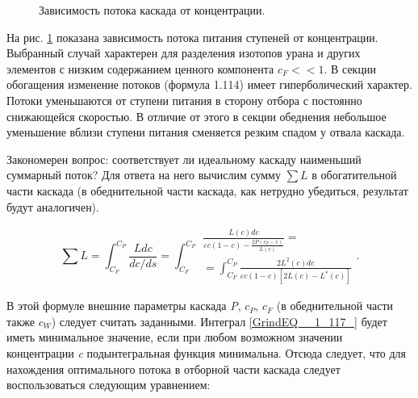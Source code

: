 \begin{figure}[ht]
    \caption{Зависимость потока каскада от концентрации.}\label{depend}
  \end{figure}

На рис. \ref*{depend} показана зависимость потока питания ступеней от концентрации. Выбранный случай характерен для разделения изотопов урана и других элементов с низким содержанием ценного компонента $c_{F} <<1$. В секции обогащения изменение потоков (формула 1.114) имеет гиперболический характер. Потоки уменьшаются от ступени питания в сторону отбора с постоянно снижающейся скоростью. В отличие от этого в секции обеднения небольшое уменьшение вблизи ступени питания сменяется резким спадом у отвала каскада.

Закономерен вопрос: соответствует ли идеальному каскаду наименьший суммарный поток? Для ответа на него вычислим сумму $\sum L $ в обогатительной части каскада (в обеднительной части каскада, как нетрудно убедиться, результат будут аналогичен).

\begin{equation} \label{GrindEQ__1_117_} 
\sum L =\int _{C_{F} }^{C_{P} }\frac{Ldc}{dc/ds}  =\int _{C_{F} }^{C_{P} }\begin{array}{l} {\frac{L(c)dc}{\varepsilon c(1-c)-\frac{2P(c_{P} -c)}{L(c)} } =} \\ {=\int _{C_{F} }^{C_{P} }\frac{2L^{2} (c)dc}{\varepsilon c(1-c)\left[2L(c)-L^{*} (c)\right]}  } \end{array} .                     
\end{equation} 

В этой формуле внешние параметры каскада \textit{P}, $c_{P} $, $c_{F} $ (в обеднительной части также $c_{W} $) следует считать заданными. Интеграл \ref{GrindEQ__1_117_} будет иметь минимальное значение, если при любом возможном значении концентрации \textit{c} подынтегральная функция минимальна. Отсюда следует, что для нахождения оптимального потока в отборной части каскада следует воспользоваться следующим уравнением:

